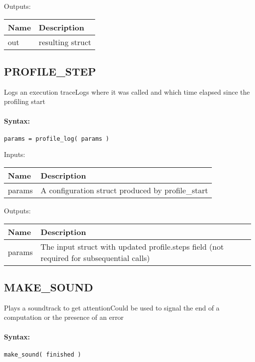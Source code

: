 \bigskip
Outputs:

\begin{tabular}{|p{}|p{}|}
\hline
\textbf{Name} & \textbf{Description} \\
\hline \hline
out & resulting struct  \\ \hline
\end{tabular}

\subsection{PROFILE\_STEP}

Logs an execution traceLogs where it was called and which time elapsed since the profiling start

\paragraph{Syntax:} \verb|params = profile_log( params )|

\bigskip
Inputs:

\begin{tabular}{|p{}|p{}|}
\hline
\textbf{Name} & \textbf{Description} \\
\hline \hline
params & A configuration struct produced by profile\_start  \\ \hline
\end{tabular}

\bigskip
Outputs:

\begin{tabular}{|p{}|p{}|}
\hline
\textbf{Name} & \textbf{Description} \\
\hline \hline
params & The input struct with updated profile.steps field (not required for subsequential calls)  \\ \hline
\end{tabular}

\subsection{MAKE\_SOUND}

Plays a soundtrack to get attentionCould be used to signal the end of a computation or the presence of an error

\paragraph{Syntax:} \verb|make_sound( finished )|

